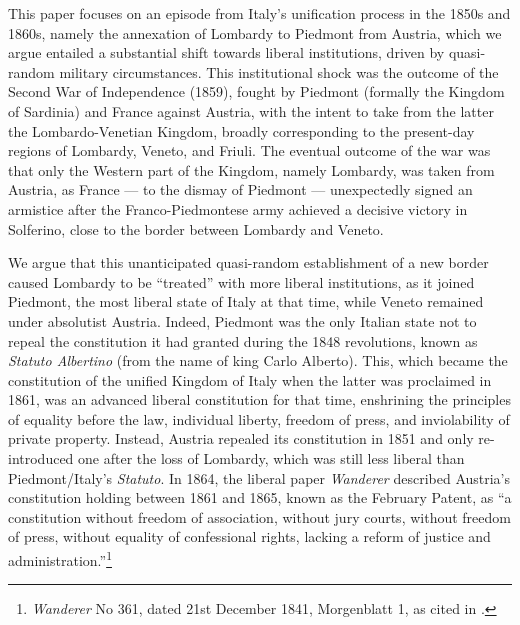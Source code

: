 This paper focuses on an episode from Italy’s unification process in the 1850s and 1860s, namely the annexation of Lombardy to Piedmont from Austria, which we argue entailed a substantial shift towards liberal institutions, driven by quasi-random military circumstances. 
This institutional shock was the outcome of the Second War of Independence (1859), fought by Piedmont (formally the Kingdom of Sardinia) and France against Austria, with the intent to take from the latter the Lombardo-Venetian Kingdom, broadly corresponding to the present-day regions of Lombardy, Veneto, and Friuli. 
The eventual outcome of the war was that only the Western part of the Kingdom, namely Lombardy, was taken from Austria, as France --- to the dismay of Piedmont --- unexpectedly signed an armistice after the Franco-Piedmontese army achieved a decisive victory in Solferino, close to the border between Lombardy and Veneto. 

We argue that this unanticipated quasi-random establishment of a new border caused Lombardy to be ``treated'' with more liberal institutions, as it joined Piedmont, the most liberal state of Italy at that time, while Veneto remained under absolutist Austria. 
Indeed, Piedmont was the only Italian state not to repeal the constitution it had granted during the 1848 revolutions, known as \textit{Statuto Albertino} (from the name of king Carlo Alberto). 
This, which became the constitution of the unified Kingdom of Italy when the latter was proclaimed in 1861, was an advanced liberal constitution  for that time, %
enshrining the principles of equality before the law, individual liberty, freedom of press, and inviolability of private property.
Instead, Austria repealed its constitution in 1851 %
and only re-introduced one after the loss of Lombardy, which was still less liberal than Piedmont/Italy's \textit{Statuto}. 
In 1864, the liberal paper \textit{Wanderer} described Austria's constitution holding between 1861 and 1865, known as the February Patent, as  ``a constitution without freedom of association, without jury courts, without freedom of press, without equality of confessional rights, lacking a reform of justice and administration.”\footnote{\textit{Wanderer} No 361, dated 21st December 1841, Morgenblatt 1, as cited in \citet{olechowski2010}.
}

